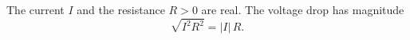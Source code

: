 \documentclass{article}
\begin{document}
The current $I$ and the resistance $R>0$ are real. The voltage drop has magnitude
\begin{equation}
\sqrt{I^2R^2} = |I|\,R .
\label{eq:v}
\end{equation}
\end{document}
